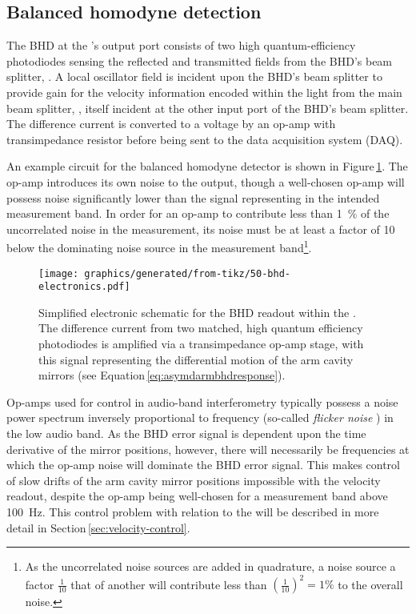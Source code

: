 \subsection{\label{sec:bhd}Balanced homodyne detection}
     
The \gls{BHD} at the \SSMEXPT{}'s output port consists of two high quantum-efficiency photodiodes sensing the reflected and transmitted fields from the \gls{BHD}'s beam splitter, \MSIXTEEN{}. A local oscillator field is incident upon the \gls{BHD}'s beam splitter to provide gain for the velocity information encoded within the light from the main beam splitter, \MSIX{}, itself incident at the other input port of the \gls{BHD}'s beam splitter. The difference current is converted to a voltage by an op-amp with transimpedance resistor \RT{} before being sent to the data acquisition system (\gls{DAQ}).

An example circuit for the balanced homodyne detector is shown in Figure\,\ref{fig:bhd-electronics}. The op-amp introduces its own noise to the output, though a well-chosen op-amp will possess noise significantly lower than the signal representing \LMINUS{} in the intended measurement band. In order for an op-amp to contribute less than \SI{1}{\percent} of the uncorrelated noise in the measurement, its noise must be at least a factor of \SI{10}{} below the dominating noise source in the measurement band\footnote{As the uncorrelated noise sources are added in quadrature, a noise source a factor $\frac{1}{10}$ that of another will contribute less than $\left(\frac{1}{10}\right)^2 = 1\%$ to the overall noise.}.

\begin{figure}
  \centering
  \texttt{[image: graphics/generated/from-tikz/50-bhd-electronics.pdf]}
  \caption[Electronic schematic for the balanced homodyne readout]{\label{fig:bhd-electronics}Simplified electronic schematic for the BHD readout within the \SSMEXPT{}. The difference current from two matched, high quantum efficiency photodiodes is amplified via a transimpedance op-amp stage, with this signal representing the differential motion of the arm cavity mirrors (see Equation\,\ref{eq:asymdarmbhdresponse}).}
\end{figure}

Op-amps used for control in audio-band interferometry typically possess a noise power spectrum inversely proportional to frequency (so-called \emph{flicker noise} \cite[Section\,11.2.3]{Gray2009}) in the low audio band. As the \gls{BHD} error signal is dependent upon the time derivative of the mirror positions, however, there will necessarily be frequencies at which the op-amp noise will dominate the \gls{BHD} error signal. This makes control of slow drifts of the arm cavity mirror positions impossible with the velocity readout, despite the op-amp being well-chosen for a measurement band above \SI{100}{\hertz}. This control problem with relation to the \SSMEXPT{} will be described in more detail in Section\,\ref{sec:velocity-control}.

